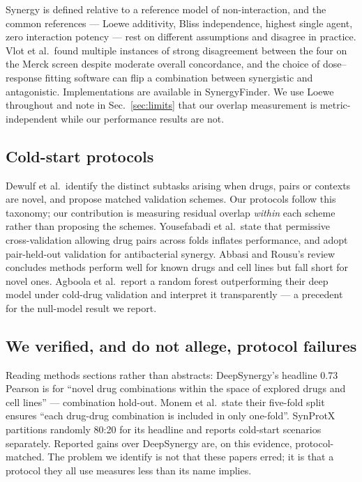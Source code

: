 \documentclass{ws-procs11x85}
\begin{document}
Synergy is defined relative to a reference model of non-interaction, and the
common references --- Loewe additivity, Bliss independence, highest single agent,
zero interaction potency --- rest on different assumptions and disagree in
practice.\cite{vlot2019,duarte2022,roell2017} Vlot et al.\ found multiple
instances of strong disagreement between the four on the Merck screen despite
moderate overall concordance,\cite{vlot2019} and the choice of dose--response
fitting software can flip a combination between synergistic and
antagonistic.\cite{fuentealba2023} Implementations are available in
SynergyFinder.\cite{ianevski2022} We use Loewe throughout and note in
Sec.~\ref{sec:limits} that our overlap measurement is metric-independent while
our performance results are not.

\subsection{Cold-start protocols}

Dewulf et al.\ identify the distinct subtasks arising when drugs, pairs or
contexts are novel, and propose matched validation schemes.\cite{dewulf2021} Our
protocols follow this taxonomy; our contribution is measuring residual overlap
\emph{within} each scheme rather than proposing the schemes. Yousefabadi et al.\
state that permissive cross-validation allowing drug pairs across folds inflates
performance, and adopt pair-held-out validation for antibacterial
synergy.\cite{yousefabadi2025} Abbasi and Rousu's review concludes methods
perform well for known drugs and cell lines but fall short for novel
ones.\cite{abbasi2024} Agboola et al.\ report a random forest outperforming their
deep model under cold-drug validation and interpret it
transparently\cite{agboola2026} --- a precedent for the null-model result we
report.

\subsection{We verified, and do not allege, protocol failures}\label{sec:verified}

Reading methods sections rather than abstracts: DeepSynergy's headline 0.73
Pearson is for ``novel drug combinations within the space of explored drugs and
cell lines'' --- combination hold-out.\cite{preuer2018} Monem et al.\ state their
five-fold split ensures ``each drug-drug combination is included in only
one-fold''.\cite{monem2024} SynProtX partitions randomly 80:20 for its headline
and reports cold-start scenarios separately.\cite{boonyarit2025} Reported gains
over DeepSynergy are, on this evidence, protocol-matched. The problem we identify
is not that these papers erred; it is that a protocol they all use measures less
than its name implies.
\end{document}
